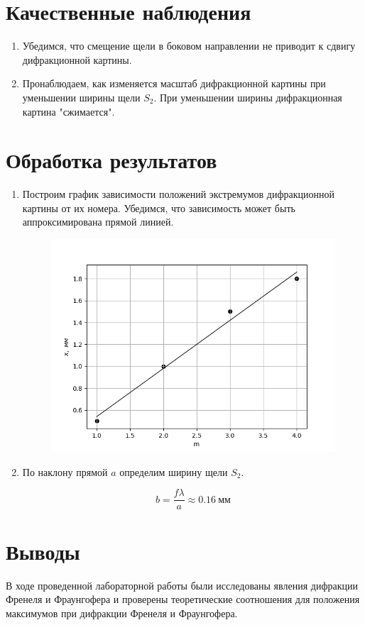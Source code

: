 \documentclass[14pt, a4paper]{report}
\begin{document}
\section{Качественные наблюдения}

\begin{enumerate}

\item Убедимся, что смещение щели в боковом направлении не приводит к сдвигу дифракционной картины.

\item Пронаблюдаем, как изменяется масштаб дифракционной картины при уменьшении ширины щели $S_2$. При уменьшении ширины дифракционная картина "сжимается".

\end{enumerate}

\section{Обработка результатов}

\begin{enumerate}

\item Построим график зависимости положений экстремумов дифракционной картины от их номера. Убедимся, что зависимость может быть аппроксимирована прямой линией.

\begin{figure}[H]
\centering
\includegraphics[scale=0.6]{../images/431_1}
\end{figure}

\item По наклону прямой $a$ определим ширину щели $S_2$.

\[b=\frac{f\lambda}{a}\approx0.16\ мм\]

\end{enumerate}

\section{Выводы}

В ходе проведенной лабораторной работы были исследованы явления дифракции Френеля и Фраунгофера и проверены теоретические соотношения для положения максимумов при дифракции Френеля и Фраунгофера.
\end{document}
